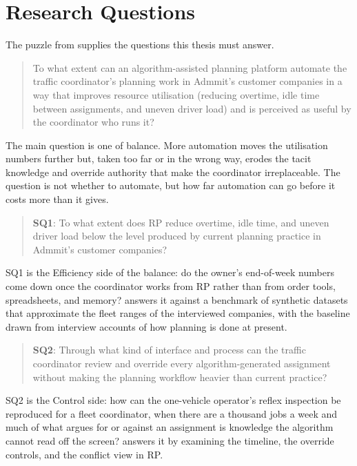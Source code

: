 \section{Research Questions}
\label{sec:research-questions}

The puzzle from  supplies the questions this thesis must answer.

\begin{quote}
To what extent can an algorithm-assisted planning platform automate the traffic coordinator's planning work in Admmit's customer companies in a way that improves resource utilisation (reducing overtime, idle time between assignments, and uneven driver load) and is perceived as useful by the coordinator who runs it?
\end{quote}

The main question is one of balance. More automation moves the utilisation numbers further but, taken too far or in the wrong way, erodes the tacit knowledge and override authority that make the coordinator irreplaceable. The question is not whether to automate, but how far automation can go before it costs more than it gives.

\begin{quote}
\textbf{SQ1}: To what extent does RP reduce overtime, idle time, and uneven driver load below the level produced by current planning practice in Admmit's customer companies?
\end{quote}

SQ1 is the Efficiency side of the balance: do the owner's end-of-week numbers come down once the coordinator works from RP rather than from order tools, spreadsheets, and memory?  answers it against a benchmark of synthetic datasets that approximate the fleet ranges of the interviewed companies, with the baseline drawn from interview accounts of how planning is done at present.

\begin{quote}
\textbf{SQ2}: Through what kind of interface and process can the traffic coordinator review and override every algorithm-generated assignment without making the planning workflow heavier than current practice?
\end{quote}

SQ2 is the Control side: how can the one-vehicle operator's reflex inspection be reproduced for a fleet coordinator, when there are a thousand jobs a week and much of what argues for or against an assignment is knowledge the algorithm cannot read off the screen?  answers it by examining the timeline, the override controls, and the conflict view in RP.

